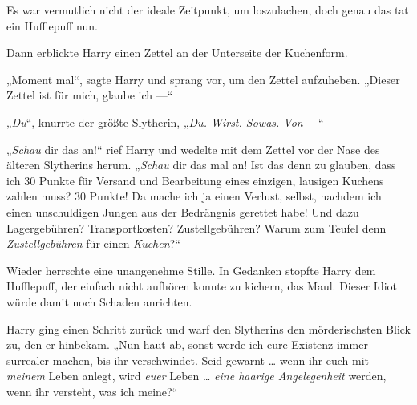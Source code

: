 Es war vermutlich nicht der ideale Zeitpunkt, um loszulachen, doch genau das tat ein Hufflepuff nun.

Dann erblickte Harry einen Zettel an der Unterseite der Kuchenform.

„Moment mal“, sagte Harry und sprang vor, um den Zettel aufzuheben.
„Dieser Zettel ist für mich, glaube ich —“

„\emph{Du}“, knurrte der größte Slytherin,
„\emph{Du. Wirst. Sowas. Von —}“

„\emph{Schau} dir das an!“ rief Harry und wedelte mit dem Zettel vor der Nase des älteren Slytherins herum.
„\emph{Schau} dir das mal an! Ist das denn zu glauben, dass ich 30 Punkte für Versand und Bearbeitung eines einzigen, lausigen Kuchens zahlen muss? 30 Punkte! Da mache ich ja einen Verlust, selbst, nachdem ich einen unschuldigen Jungen aus der Bedrängnis gerettet habe! Und dazu Lagergebühren? Transportkosten? Zustellgebühren? Warum zum Teufel denn \emph{Zustellgebühren} für einen \emph{Kuchen}?“

Wieder herrschte eine unangenehme Stille. In Gedanken stopfte Harry dem Hufflepuff, der einfach nicht aufhören konnte zu kichern, das Maul. Dieser Idiot würde damit noch Schaden anrichten.

Harry ging einen Schritt zurück und warf den Slytherins den mörderischsten Blick zu, den er hinbekam.
„Nun haut ab, sonst werde ich eure Existenz immer surrealer machen, bis ihr verschwindet. Seid gewarnt … wenn ihr euch mit \emph{meinem} Leben anlegt, wird \emph{euer} Leben … \emph{eine haarige Angelegenheit} werden, wenn ihr versteht, was ich meine?“

